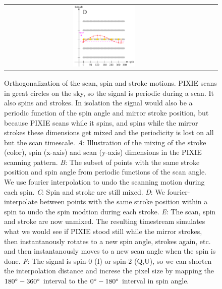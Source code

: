 \documentclass{article}
\begin{document}
\begin{figure}
\begin{tabular}{ccc}
		\includegraphics[width=0.32\textwidth]{plots/shift4.pdf}
	\end{tabular}
	\caption{Orthogonalization of the scan, spin and stroke
	motions. PIXIE scans in great circles on the sky, so the
	signal is periodic during a scan. It also spins and strokes.
	In isolation the signal would also be a periodic function
	of the spin angle and mirror stroke position, but because
	PIXIE scans while it spins, and spins
	while the mirror strokes these dimensions get mixed and the
	periodicity is lost on all but the scan timescale.
	\emph{A}: Illustration of the mixing of the stroke (color),
	spin (x-axis) and scan (y-axis) dimensions in the PIXIE scanning
	pattern. \emph{B}: The subset of points with the same stroke
	position and spin angle from periodic functions of the scan
	angle. We use fourier interpolation to undo the scanning
	motion during each spin. \emph{C}: Spin and stroke are still
	mixed. \emph{D}: We fourier-interpolate between points with
	the same stroke position within a spin to undo the spin
	modtion during each stroke. \emph{E}: The scan, spin and stroke
	are now unmixed. The resulting timestream simulates what we would
	see if PIXIE stood still while the mirror strokes, then
	instantanously rotates to a new spin angle, strokes again, etc.
	and then instantanously moves to a new scan angle when the spin is done.
	\emph{F}: The signal is spin-0 (I) or spin-2 (Q,U), so we can
	shorten the interpolation distance and increse the pixel size
	by mapping the $180\degree-360\degree$ interval to the $0\degree-
	180\degree$ interval in spin angle.}
\end{figure}
\end{document}
